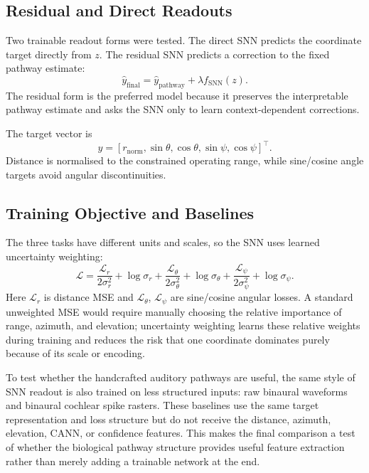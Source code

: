 \subsection{Residual and Direct Readouts}

Two trainable readout forms were tested. The direct SNN predicts the coordinate target directly from $z$. The residual SNN predicts a correction to the fixed pathway estimate:
\begin{equation}
    \hat{y}_{\mathrm{final}}
    =
    \hat{y}_{\mathrm{pathway}}
    +
    \lambda f_{\mathrm{SNN}}(z).
\end{equation}
The residual form is the preferred model because it preserves the interpretable pathway estimate and asks the SNN only to learn context-dependent corrections.

The target vector is
\begin{equation}
    y=
    \left[
    r_{\mathrm{norm}},
    \sin\theta,
    \cos\theta,
    \sin\psi,
    \cos\psi
    \right]^{\top}.
\end{equation}
Distance is normalised to the constrained operating range, while sine/cosine angle targets avoid angular discontinuities.

\subsection{Training Objective and Baselines}

The three tasks have different units and scales, so the SNN uses learned uncertainty weighting:
\begin{equation}
    \mathcal{L}
    =
    \frac{\mathcal{L}_r}{2\sigma_r^2}+\log\sigma_r
    +
    \frac{\mathcal{L}_{\theta}}{2\sigma_{\theta}^2}+\log\sigma_{\theta}
    +
    \frac{\mathcal{L}_{\psi}}{2\sigma_{\psi}^2}+\log\sigma_{\psi}.
\end{equation}
Here $\mathcal{L}_r$ is distance MSE and $\mathcal{L}_{\theta}$, $\mathcal{L}_{\psi}$ are sine/cosine angular losses. A standard unweighted MSE would require manually choosing the relative importance of range, azimuth, and elevation; uncertainty weighting learns these relative weights during training and reduces the risk that one coordinate dominates purely because of its scale or encoding.

To test whether the handcrafted auditory pathways are useful, the same style of SNN readout is also trained on less structured inputs: raw binaural waveforms and binaural cochlear spike rasters. These baselines use the same target representation and loss structure but do not receive the distance, azimuth, elevation, CANN, or confidence features. This makes the final comparison a test of whether the biological pathway structure provides useful feature extraction rather than merely adding a trainable network at the end.

